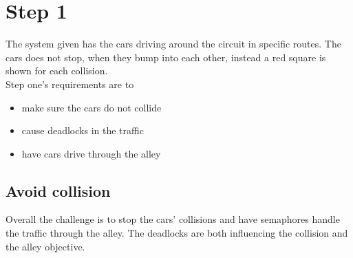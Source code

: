 \section{Step 1}
The system given has the cars driving around the circuit in specific routes. The cars does not stop, when they bump into each other, instead a red square is shown for each collision.
\\

Step one's requirements are to
\begin{itemize}
\item make sure the cars do not collide
\item cause deadlocks in the traffic
\item have cars drive through the alley
\end{itemize}

\subsection{Avoid collision}
Overall the challenge is to stop the cars' collisions and have semaphores handle the traffic through the alley. The deadlocks are both influencing the collision and the alley objective.

